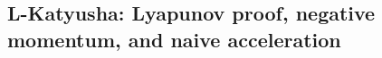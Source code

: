 \subsection{L-Katyusha: Lyapunov proof, negative momentum, and naive acceleration}\label{sec:th-A3}

